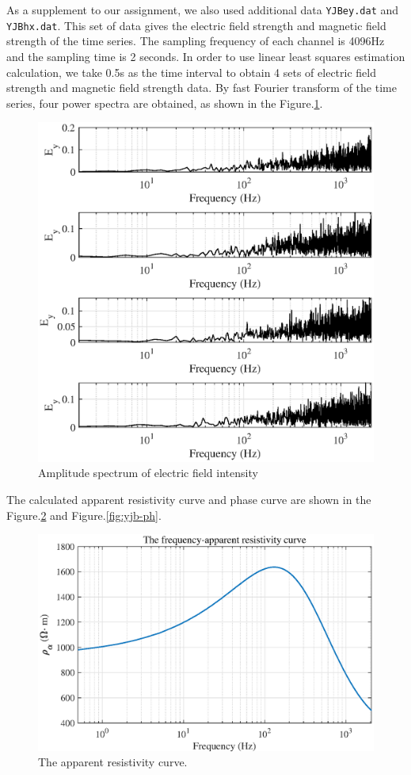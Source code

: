 \documentclass[9pt,a4paper,twoside]{rho-class/rho}
\begin{document}
As a supplement to our assignment, we also used additional data \texttt{YJBey.dat} and \texttt{YJBhx.dat}. This set of data gives the electric field strength and magnetic field strength of the time series. The sampling frequency of each channel is 4096Hz and the sampling time is 2 seconds. In order to use linear least squares estimation calculation, we take 0.5s as the time interval to obtain 4 sets of electric field strength and magnetic field strength data. By fast Fourier transform of the time series, four power spectra are obtained, as shown in the Figure.\ref{fig:ef}.

\begin{figure}[htbp]
    \centering
    \includegraphics[width=0.95\columnwidth]{figures/ef.eps}
    \caption{Amplitude spectrum of electric field intensity}
    \label{fig:ef}
\end{figure}

The calculated apparent resistivity curve and phase curve are shown in the Figure.\ref{fig:yjb-ra} and Figure.\ref{fig:yjb-ph}.

\begin{figure}[htbp]
    \centering
    \includegraphics[width=0.95\columnwidth]{figures/YJBra.eps}
    \caption{The apparent resistivity curve.}
    \label{fig:yjb-ra}
\end{figure}
\end{document}
